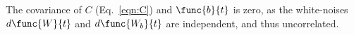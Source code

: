 The covariance of $C$ (Eq.~\ref{eqn:C}) and $\func{b}{t}$ is zero, as the white-noises $d\func{W}{t}$ and $d\func{W_b}{t}$ are independent, and thus uncorrelated.
